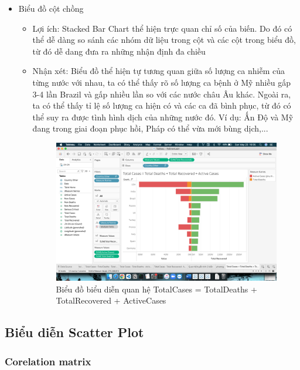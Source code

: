 \documentclass[a4paper, 12pt]{article}
\begin{document}
\begin{itemize}
    \item Biểu đồ cột chồng
    \begin{itemize}
        \item Lợi ích: Stacked Bar Chart thể hiện trực quan chỉ số của biến. Do đó có thể dễ dàng so sánh các nhóm dữ liệu trong cột và các cột trong biểu đồ, từ đó dễ dang đưa ra những nhận định đa chiều
        \item Nhận xét: Biểu đồ thể hiện tự tương quan giữa số lượng ca nhiễm của từng nước với nhau, ta có thể thấy rõ số lượng ca bệnh ở Mỹ nhiều gấp 3-4 lần Brazil và gấp nhiều lần so với các nước châu Âu khác. Ngoài ra, ta có thể thấy tỉ lệ số lượng ca hiện có và các ca đã bình phục, từ đó có thể suy ra được tình hình dịch của những nước đó. Ví dụ: Ấn Độ và Mỹ đang trong giai đoạn phục hồi, Pháp có thể vừa mới bùng dịch,...
        \begin{figure}[H]
            \begin{center}
                \includegraphics[scale=0.4]{img/stackedBar.png}
                \caption{Biểu đồ biểu diễn quan hệ TotalCases = TotalDeaths + TotalRecovered + ActiveCases}
            \end{center}
        \end{figure}
    \end{itemize}
\end{itemize}

\subsection{Biểu diễn Scatter Plot}

\subsubsection{Corelation matrix}
\end{document}

